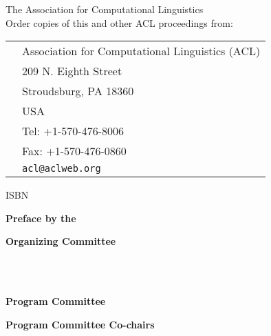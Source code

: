 \documentclass[11pt,oneside]{article}
\begin{document}
\vspace*{11cm}
{\large

\noindent
\textcopyright {} The Association for Computational Linguistics\\

\vspace*{2cm}
\noindent
Order copies of this and other ACL proceedings from:

\vspace*{1cm}
\begin{tabular}{p{1.5cm}l}
& Association for Computational Linguistics (ACL)\\
& 209 N. Eighth Street\\
& Stroudsburg, PA 18360\\
& USA\\
& Tel: +1-570-476-8006\\
& Fax: +1-570-476-0860\\
&{\tt acl@aclweb.org}\\
\end{tabular}

ISBN 
\newpage


  \begin{center}
    \Large \textbf{Preface by the }
  \end{center}
  \vspace*{0.5cm}
  \newpage
{}

\begin{center}
\Large \textbf{Organizing Committee}
\end{center}
\vspace*{1cm}
  \textbf{}\\
    \\
  \newline
{}
\newpage

\begin{center}
\Large \textbf{Program Committee}
\end{center}
\vspace*{1cm}
\textbf{Program Committee Co-chairs}\\
  \\

}
\end{document}
